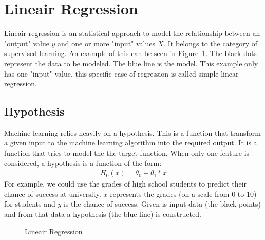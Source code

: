 \section{Lineair Regression}
Lineair regression is an statistical approach to model the relationship between an "output" value $y$ and one or more "input" values $X$. It belongs to the category of supervised learning. An example of this can be seen in Figure~\ref{fig:regression}. The black dots represent the data to be modeled. The blue line is the model. This example only has one "input" value, this specific case of regression is called simple linear regression. \cite{scikit-regression}

\subsection{Hypothesis}
Machine learning relies heavily on a hypothesis. This is a function that transform a given input to the machine learning algorithm into the required output. It is a function that tries to model the the target function. When only one feature is considered, a hypothesis is a function of the form: 
\begin{align}
H_0(x) = \theta_0 + \theta_1 * x
\end{align}
For example, we could use the grades of high school students to predict their chance of success at university. $x$ represents the grades (on a scale from 0 to 10) for students and $y$ is the chance of success. Given is input data (the black points) and from that data a hypothesis (the blue line) is constructed.

\begin{figure}[H]
\centering
{}
\caption{Lineair Regression} \label{fig:regression}
\end{figure}

